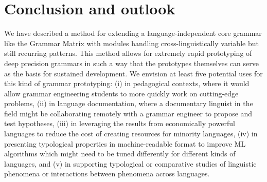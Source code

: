 \section{Conclusion and outlook}

We have described a method for extending a language-independent core
grammar like the Grammar Matrix with modules handling
cross-linguistically variable but still recurring patterns.  This
method allows for extremely rapid prototyping of deep precision
grammars in such a way that the prototypes themselves can serve as the
basis for sustained development.  We envision at least five potential
uses for this kind of grammar prototyping: (i) in pedagogical
contexts, where it would allow grammar engineering students to more
quickly work on cutting-edge problems, (ii) in language documentation,
where a documentary linguist in the field might be collaborating
remotely with a grammar engineer to propose and test hypotheses, (iii)
in leveraging the results from economically powerful languages to
reduce the cost of creating resources for minority languages, (iv) in
presenting typological properties in machine-readable format to
improve ML algorithms which might need to be tuned differently for
different kinds of languages, and (v) in supporting typological or
comparative studies of linguistic phenomena or interactions between
phenomena across languages.


%






